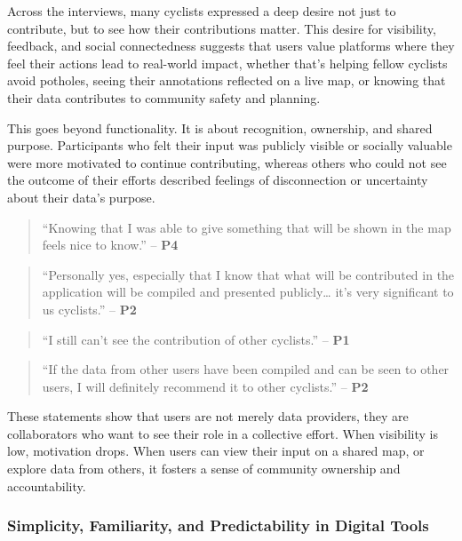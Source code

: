 Across the interviews, many cyclists expressed a deep desire not just to contribute, but to see how their contributions matter. This desire for visibility, feedback, and social connectedness suggests that users value platforms where they feel their actions lead to real-world impact, whether that's helping fellow cyclists avoid potholes, seeing their annotations reflected on a live map, or knowing that their data contributes to community safety and planning.

This goes beyond functionality. It is about recognition, ownership, and shared purpose. Participants who felt their input was publicly visible or socially valuable were more motivated to continue contributing, whereas others who could not see the outcome of their efforts described feelings of disconnection or uncertainty about their data's purpose.

\begin{quote}
``Knowing that I was able to give something that will be shown in the map feels nice to know.'' – \textbf{P4}
\end{quote}

\begin{quote}
``Personally yes, especially that I know that what will be contributed in the application will be compiled and presented publicly… it's very significant to us cyclists.'' – \textbf{P2}
\end{quote}

\begin{quote}
``I still can't see the contribution of other cyclists.'' – \textbf{P1}
\end{quote}

\begin{quote}
``If the data from other users have been compiled and can be seen to other users, I will definitely recommend it to other cyclists.'' – \textbf{P2}
\end{quote}

These statements show that users are not merely data providers, they are collaborators who want to see their role in a collective effort. When visibility is low, motivation drops. When users can view their input on a shared map, or explore data from others, it fosters a sense of community ownership and accountability.

\subsubsection{Simplicity, Familiarity, and Predictability in Digital Tools}

